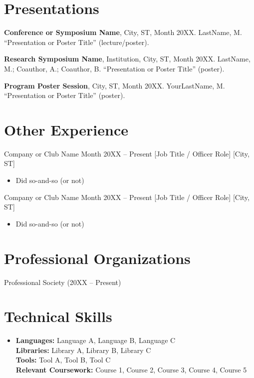 \documentclass[letterpaper,11pt]{article}
\newcommand{\resumeItem}[1]{\item #1}
\newcommand{\resumeText}[1]{#1\par}
\begin{document}
\vspace{-1.5em}
\section*{Presentations}
\resumeText{\textbf{Conference or Symposium Name}, City, ST, Month 20XX. LastName, M. ``Presentation or Poster Title'' (lecture/poster).}
\resumeText{\textbf{Research Symposium Name}, Institution, City, ST, Month 20XX. LastName, M.; Coauthor, A.; Coauthor, B. ``Presentation or Poster Title'' (poster).}
\resumeText{\textbf{Program Poster Session}, City, ST, Month 20XX. YourLastName, M. ``Presentation or Poster Title'' (poster).}

\section*{Other Experience}
\resumeSubheading
  {Company or Club Name}
  {Month 20XX -- Present}
  [Job Title / Officer Role]
  [City, ST]
\begin{itemize}
  \resumeItem{Did so-and-so (or not)}
\end{itemize}

\resumeSubheading
  {Company or Club Name}
  {Month 20XX -- Present}
  [Job Title / Officer Role]
  [City, ST]
\begin{itemize}
  \resumeItem{Did so-and-so (or not)}
\end{itemize}


\section*{Professional Organizations}
\resumeText{Professional Society (20XX -- Present)}


\section*{Technical Skills}
 \begin{itemize}[leftmargin=0in, label={}]
    \item[]{
     \textbf{Languages: }{Language A, Language B, Language C} \\
     \textbf{Libraries: }{Library A, Library B, Library C} \\
     \textbf{Tools: }{Tool A, Tool B, Tool C} \\
     \textbf{Relevant Coursework: }{Course 1, Course 2, Course 3, Course 4, Course 5}
    }
 \end{itemize}
\end{document}
